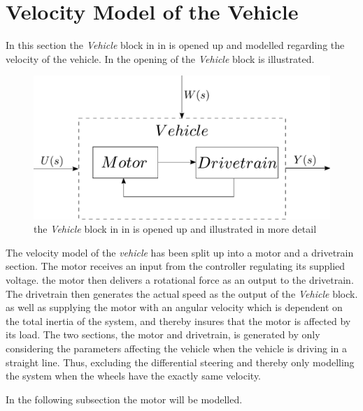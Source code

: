 \section{Velocity Model of the Vehicle}
In this section the \textit{Vehicle} block in  in  is opened up and modelled regarding the velocity of the vehicle. In  the opening of the \textit{Vehicle} block is illustrated.

\begin{figure}[H]
	\centering
	\includegraphics[scale=0.6]{figures/plantopen.pdf}
	\caption{the \textit{Vehicle} block in  in  is opened up and illustrated in more detail}
	\label{fig:Velocitymodelplantopen}
\end{figure}

The velocity model of the \textit{vehicle} has been split up into a motor and a drivetrain section. The motor receives an input from the controller regulating its supplied voltage. the motor then delivers a rotational force as an output to the drivetrain. The drivetrain then generates the actual speed as the output of the \textit{Vehicle} block. as well as supplying the motor with an angular velocity which is dependent on the total inertia of the system, and thereby insures that the motor is affected by its load. The two sections, the motor and drivetrain, is generated by only considering the parameters affecting the vehicle when the vehicle is driving in a straight line. Thus, excluding the differential steering and thereby only modelling the system when the wheels have the exactly same velocity.

In the following subsection the motor will be modelled.